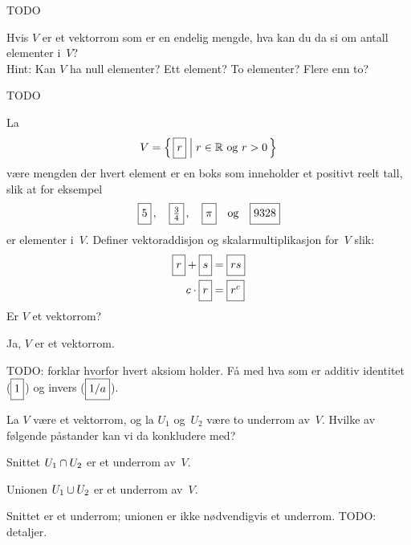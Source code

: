 \begin{losning}
TODO
\end{losning}


\begin{oppgave}
Hvis $V$ er et vektorrom som er en endelig mengde, hva kan du da si om
antall elementer i~$V$?
\\
Hint: Kan $V$ ha null elementer?  Ett element?  To elementer?  Flere
enn to?
\end{oppgave}

\begin{losning}
TODO
\end{losning}


\begin{oppgave}
La
\[
V = \left\{\, \boks{r} \;\middle|\; \text{$r \in \R$ og $r > 0$} \,\right\}
\]
være mengden der hvert element er en boks som inneholder et positivt reelt tall,
slik at for eksempel
\[
\boks{5}\,,\quad
\boks{\frac{3}{4}}\,,\quad
\boks{\pi}\quad\text{og}\quad
\boks{9328}
\]
er elementer i~$V$.  Definer vektoraddisjon og skalarmultiplikasjon
for~$V$ slik:
\begin{align*}
\boks{r} + \boks{s} &= \boks{rs} \\
c \cdot \boks{r}    &= \boks{r^c}
\end{align*}
Er $V$ et vektorrom?
\end{oppgave}

\begin{losning}
Ja, $V$ er et vektorrom.

TODO: forklar hvorfor hvert aksiom holder.  Få med hva som er additiv
identitet ($\boks{1}$) og invers ($\boks{1/a}$).
\end{losning}


\begin{oppgave}
La $V$ være et vektorrom, og la $U_1$ og~$U_2$ være to underrom
av~$V$.  Hvilke av følgende påstander kan vi da konkludere med?
\begin{punkt}
Snittet $U_1 \cap U_2$ er et underrom av~$V$.
\end{punkt}
\begin{punkt}
Unionen $U_1 \cup U_2$ er et underrom av~$V$.
\end{punkt}
\end{oppgave}

\begin{losning}
Snittet er et underrom; unionen er ikke nødvendigvis et underrom.
TODO: detaljer.
\end{losning}



